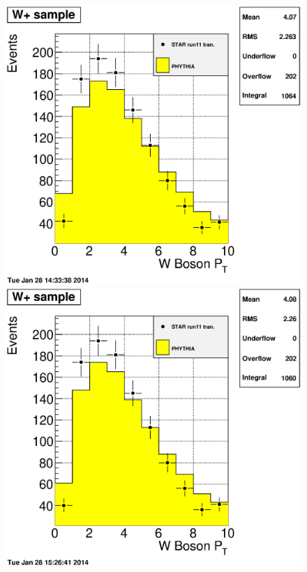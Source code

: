 \documentclass[12pt]{article}
\begin{document}
\begin{figure}[htbp]
\begin{center}
\includegraphics[scale=0.28]{images/Pt-Recoil-study/plot_DataMc_WpPt_PtRecoil02}
\includegraphics[scale=0.28]{images/Pt-Recoil-study/plot_DataMc_WpPt_PtRecoil03}

\end{center}
\end{figure}
\end{document}

